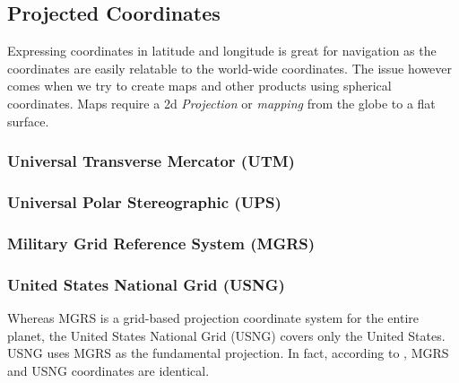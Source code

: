 \subsection*{Projected Coordinates}

Expressing coordinates in latitude and longitude is great for navigation 
as the coordinates are easily relatable to the world-wide coordinates. 
The issue however comes when we try to create maps and other products using
spherical coordinates.  Maps require a 2d \emph{Projection} or \emph{mapping}
from the globe to a flat surface.  


\subsubsection*{Universal Transverse Mercator (UTM)}



\subsubsection*{Universal Polar Stereographic (UPS)}





\subsubsection*{Military Grid Reference System (MGRS)}





\subsubsection*{United States National Grid (USNG)}

Whereas MGRS is a grid-based projection coordinate system for the entire planet, 
the United States National Grid (USNG) covers only the United States.  USNG 
uses MGRS as the fundamental projection.  In fact, according to \cite[p.~3.1]{USNG_Standard},
MGRS and USNG coordinates are identical.


